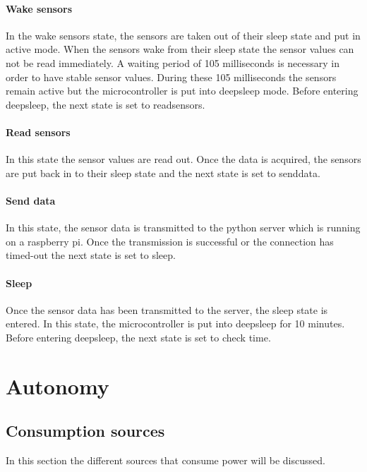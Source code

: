 \documentclass[11pt,a4paper]{article}
\begin{document}
\paragraph{Wake sensors}
In the wake sensors state, the sensors are taken out of their sleep state and put in active mode. When the sensors wake from their sleep state the sensor values can not be read immediately. A waiting period of 105 milliseconds is necessary in order to have stable sensor values. During these 105 milliseconds the sensors remain active but the microcontroller is put into deepsleep mode. Before entering deepsleep, the next state is set to readsensors. 

\paragraph{Read sensors}
In this state the sensor values are read out. Once the data is acquired, the sensors are put back in to their sleep state and the next state is set to senddata.

\paragraph{Send data}
In this state, the sensor data is transmitted to the python server which is running on a raspberry pi. Once the transmission is successful or the connection has timed-out the next state is set to sleep.

\paragraph{Sleep}
Once the sensor data has been transmitted to the server, the sleep state is entered. In this state, the microcontroller is put into deepsleep for 10 minutes. Before entering deepsleep, the next state is set to check time.


\section{Autonomy}

\subsection{Consumption sources}
In this section the different sources that consume power will be discussed.
\end{document}

